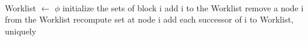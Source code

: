 {\tt
  \begin{program}{0}
   Worklist $\leftarrow$ $\phi$
   
   initialize the sets of block i
   add i to the Worklist
   
   remove a node i from the Worklist 
   recompute set at node i
   
   add each successor of i to Worklist, uniquely
    \end{program}
}